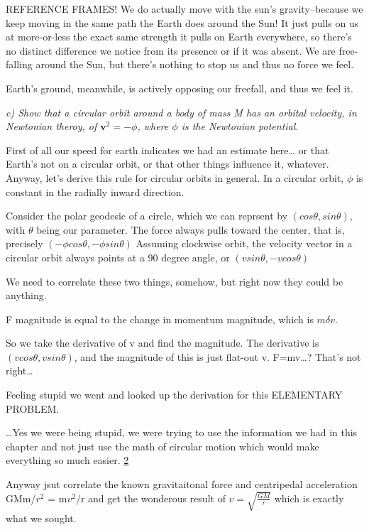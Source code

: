 \documentclass[landscape,letterpaper,10pt,english]{article}
\begin{document}
    REFERENCE FRAMES! We do actually move with the sun's gravity--because we
keep moving in the same path the Earth does around the Sun! It just
pulls on us at more-or-less the exact same strength it pulls on Earth
everywhere, so there's no distinct difference we notice from its
presence or if it was absent. We are free-falling around the Sun, but
there's nothing to stop us and thus no force we feel.

Earth's ground, meanwhile, is actively opposing our freefall, and thus
we feel it.

    \emph{c) Show that a circular orbit around a body of mass M has an
orbital velocity, in Newtonian theroy, of \(\textbf{v}^2 = -\phi\),
where \(\phi\) is the Newtonian potential.}

    First of all our speed for earth indicates we had an estimate
here\ldots{} or that Earth's not on a circular orbit, or that other
things influence it, whatever. Anyway, let's derive this rule for
circular orbits in general. In a circular orbit, \(\phi\) is constant in
the radially inward direction.

Consider the polar geodesic of a circle, which we can reprsent by
\((cos\theta, sin\theta)\), with \(\theta\) being our parameter. The
force always pulls toward the center, that is, precisely
\((-\phi cos\theta, -\phi sin\theta)\) Assuming clockwise orbit, the
velocity vector in a circular orbit always points at a 90 degree angle,
or \((vsin\theta, -vcos\theta)\)

We need to correlate these two things, somehow, but right now they could
be anything.

F magnitude is equal to the change in momentum magnitude, which is
\(m\delta v.\)

So we take the derivative of v and find the magnitude. The derivative is
\((vcos\theta, vsin\theta)\), and the magnitude of this is just flat-out
v. F=mv\ldots? That's not right\ldots{}

Feeling stupid we went and looked up the derivation for this ELEMENTARY
PROBLEM.

\ldots Yes we were being stupid, we were trying to use the information
we had in this chapter and not just use the math of circular motion
which would make everything so much easier. \hyperref[2]{2}

Anyway jsut correlate the known gravitaitonal force and centripedal
acceleration GMm/\(r^2\) = m\(v^2\)/r and get the wonderous result of
\(v = \sqrt{\frac{GM}{r}}\) which is exactly what we sought.
\end{document}
